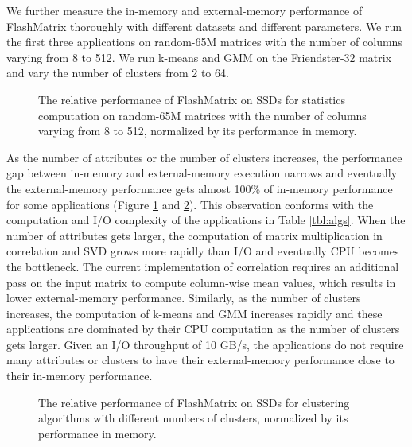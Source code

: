 We further measure the in-memory and external-memory performance of FlashMatrix
thoroughly with different datasets and different parameters. We run the first
three applications on random-65M matrices
with the number of columns varying from 8 to 512. We run k-means
and GMM on the Friendster-32 matrix and vary the number of clusters from 2 to 64.

\begin{figure}
	\begin{center}
		\footnotesize
		\vspace{-15pt}
		
		\vspace{-10pt}
		\caption{The relative performance of FlashMatrix on SSDs for
			statistics computation on random-65M matrices with the number of
			columns varying from 8 to 512, normalized by its performance
		in memory.}
		\label{perf:stat}
	\end{center}
\end{figure}

As the number of attributes or the number of clusters increases,
the performance gap between in-memory and external-memory execution
narrows and eventually the external-memory performance gets almost 100\%
of in-memory performance for some applications (Figure \ref{perf:stat} and
\ref{perf:clust}).
This observation conforms with the computation and I/O complexity of
the applications in Table \ref{tbl:algs}. When the number of attributes
gets larger, the computation of matrix multiplication in
correlation and SVD grows more rapidly than I/O and eventually CPU becomes
the bottleneck. The current implementation of correlation requires an additional
pass on the input matrix to compute column-wise mean values, which results in
lower external-memory performance. Similarly, as the number of clusters
increases, the computation of k-means and GMM increases rapidly and
these applications are dominated by their CPU computation as the number
of clusters gets larger. Given an I/O throughput of 10 GB/s, the applications
do not require many attributes or clusters to have their external-memory
performance close to their in-memory performance.

\begin{figure}
	\begin{center}
		\footnotesize
		\vspace{-15pt}
		
		\vspace{-10pt}
		\caption{The relative performance of FlashMatrix on SSDs for
			clustering algorithms with different numbers of clusters, normalized
		by its performance in memory.}
		\label{perf:clust}
	\end{center}
\end{figure}

